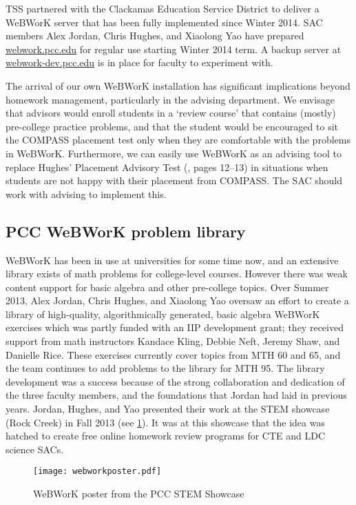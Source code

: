 TSS partnered with the Clackamas Education Service District to deliver a WeBWorK
server that has been fully implemented since Winter 2014.  SAC members Alex Jordan,
Chris Hughes, and Xiaolong Yao have prepared
\href{http://webwork.pcc.edu}{webwork.pcc.edu} for regular use starting Winter
2014 term. A backup server at
\href{http://webwork-dev.pcc.edu}{webwork-dev.pcc.edu} is in place for faculty
to experiment with. 

The arrival of our own WeBWorK installation has significant implications beyond
homework management, particularly in the advising department. We envisage that
advisors would enroll students in a `review course' that contains (mostly)
pre-college practice problems, and that the student would be encouraged to sit
the COMPASS placement test only when they are comfortable with the problems in
WeBWorK. Furthermore, we can easily use WeBWorK as an advising tool to replace
Hughes' Placement Advisory Test (\cite{mathprogramreview2003}, pages 12--13) in situations when students are not happy with
their placement from COMPASS.  The SAC should work with advising to implement
this. 

\subsection{PCC WeBWorK problem library}
WeBWorK has been in use at universities for some time now, and an extensive
library exists of math problems for college-level courses. However there was
weak content support for basic algebra and other pre-college topics. Over Summer 2013, Alex Jordan, Chris Hughes, and Xiaolong Yao oversaw an effort to create
a library of high-quality, algorithmically generated, basic algebra WeBWorK
exercises which was partly funded with an IIP development grant; they received
support from math instructors Kandace Kling, Debbie Neft, Jeremy Shaw, and Danielle Rice.  These
exercises currently cover topics from MTH 60 and 65, and the team continues to
add problems to the library for MTH 95. The library development was a success
because of the strong collaboration and dedication of the three faculty members,
and the foundations that Jordan had laid in previous years. Jordan, Hughes,
and Yao presented their work at the STEM showcase (Rock Creek) in Fall 2013 (see
\cref{webworkposter}). It was at this showcase that the idea was hatched to
create free online homework review programs for CTE and LDC science SACs.

\begin{figure}[!htb]
	\centering
	\texttt{[image: webworkposter.pdf]}
	\caption{WeBWorK poster from the PCC STEM Showcase}\label{webworkposter}
\end{figure}

